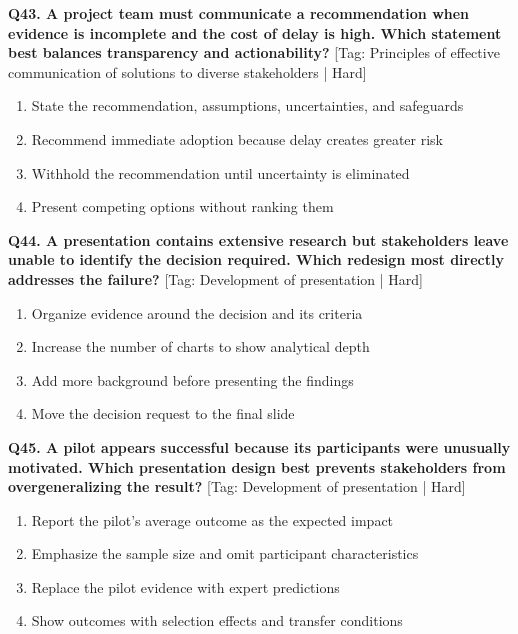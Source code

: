 \noindent\textbf{Q43. A project team must communicate a recommendation when evidence is incomplete and the cost of delay is high. Which statement best balances transparency and actionability?} \hfill [Tag: Principles of effective communication of solutions to diverse stakeholders | Hard]
\begin{enumerate}[label=(\alph*),topsep=2pt,itemsep=1pt,partopsep=0pt,parsep=0pt]
    \item {State the recommendation, assumptions, uncertainties, and safeguards}
    \item {Recommend immediate adoption because delay creates greater risk}
    \item {Withhold the recommendation until uncertainty is eliminated}
    \item {Present competing options without ranking them}
\end{enumerate}
\vspace{2mm}

\noindent\textbf{Q44. A presentation contains extensive research but stakeholders leave unable to identify the decision required. Which redesign most directly addresses the failure?} \hfill [Tag: Development of presentation | Hard]
\begin{enumerate}[label=(\alph*),topsep=2pt,itemsep=1pt,partopsep=0pt,parsep=0pt]
    \item {Organize evidence around the decision and its criteria}
    \item {Increase the number of charts to show analytical depth}
    \item {Add more background before presenting the findings}
    \item {Move the decision request to the final slide}
\end{enumerate}
\vspace{2mm}

\noindent\textbf{Q45. A pilot appears successful because its participants were unusually motivated. Which presentation design best prevents stakeholders from overgeneralizing the result?} \hfill [Tag: Development of presentation | Hard]
\begin{enumerate}[label=(\alph*),topsep=2pt,itemsep=1pt,partopsep=0pt,parsep=0pt]
    \item {Report the pilot's average outcome as the expected impact}
    \item {Emphasize the sample size and omit participant characteristics}
    \item {Replace the pilot evidence with expert predictions}
    \item {Show outcomes with selection effects and transfer conditions}
\end{enumerate}
\vspace{2mm}

